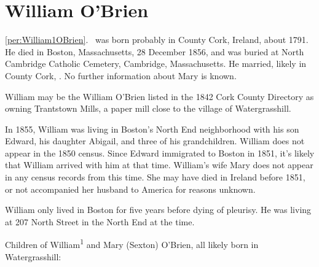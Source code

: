 \section{William O'Brien}

\ref{per:William1OBrien}.\  was born probably in County Cork, Ireland, about 1791.\cite{Census1855William} He died in Boston, Massachusetts, 28 December 1856,\cite{William1OBrienDeath} and was buried at North Cambridge Catholic Cemetery, Cambridge, Massachusetts.\cite{DianaBerberenaLetter1} He married, likely in County Cork, .\cite{Michael2OBrienDeath,Abigail2OBrienDeath,Ann2OBrienDeath,Mary2OBrienDeath} No further information about Mary is known.

William may be the William O'Brien listed in the 1842 Cork County Directory as owning Trantstown Mills, a paper mill close to the village of Watergrasshill.\cite{Jacksons}

In 1855, William was living in Boston's North End neighborhood with his son Edward, his daughter Abigail, and three of his grandchildren.\cite{Census1855William,Wards} William does not appear in the 1850 census. Since Edward immigrated to Boston in 1851\cite{Edward2OBrienNaturalization}, it's likely that William arrived with him at that time. William's wife Mary does not appear in any census records from this time. She may have died in Ireland before 1851, or not accompanied her husband to America for reasons unknown.

William only lived in Boston for five years before dying of pleurisy. He was living at 207 North Street in the North End at the time.\cite{William1OBrienDeath}

\begin{KidsIntro}
	Children of William\textsuperscript{1} and Mary (Sexton) O'Brien, all likely born in Watergrasshill:
\end{KidsIntro}

